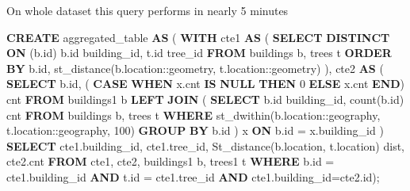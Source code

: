 \documentclass[11pt]{article}
\newenvironment{Shaded}{}{}
\newcommand{\KeywordTok}[1]{\textcolor[rgb]{0.00,0.44,0.13}{\textbf{{#1}}}}
\newcommand{\DecValTok}[1]{\textcolor[rgb]{0.25,0.63,0.44}{{#1}}}
\newcommand{\CharTok}[1]{\textcolor[rgb]{0.25,0.44,0.63}{{#1}}}
\newcommand{\FunctionTok}[1]{\textcolor[rgb]{0.02,0.16,0.49}{{#1}}}
\newcommand{\NormalTok}[1]{{#1}}
\begin{document}
On whole dataset this query performs in nearly 5 minutes

    \begin{Shaded}
\begin{Highlighting}[]
\KeywordTok{CREATE}\NormalTok{ aggregated_table }\KeywordTok{AS}\NormalTok{ ( }
\KeywordTok{WITH} 
\NormalTok{cte1 }\KeywordTok{AS} 
\NormalTok{        ( }
          \KeywordTok{SELECT} \KeywordTok{DISTINCT} \KeywordTok{ON}\NormalTok{ (b.id) b.id building_id, }
\NormalTok{          t.id tree_id }
          \KeywordTok{FROM}\NormalTok{ buildings b, }
\NormalTok{               trees     t }
          \KeywordTok{ORDER} \KeywordTok{BY}\NormalTok{ b.id, }
\NormalTok{                   st_distance(b.location:}\CharTok{:geometry}\NormalTok{, t.location:}\CharTok{:geometry}\NormalTok{) }
\NormalTok{        ), }
\NormalTok{cte2 }\KeywordTok{AS}
\NormalTok{        ( }
          \KeywordTok{SELECT}\NormalTok{ b.id, ( }
                    \KeywordTok{CASE} 
                      \KeywordTok{WHEN}\NormalTok{ x.cnt }\KeywordTok{IS} \KeywordTok{NULL} 
                      \KeywordTok{THEN} \DecValTok{0} 
                      \KeywordTok{ELSE}\NormalTok{ x.cnt }
                    \KeywordTok{END}\NormalTok{) cnt }
          \KeywordTok{FROM}\NormalTok{      buildings1 b }
          \KeywordTok{LEFT} \KeywordTok{JOIN} 
\NormalTok{                    ( }
                      \KeywordTok{SELECT}\NormalTok{   b.id building_id, }
                               \FunctionTok{count}\NormalTok{(b.id) cnt }
                      \KeywordTok{FROM}\NormalTok{  buildings b, }
\NormalTok{                            trees t }
                      \KeywordTok{WHERE}\NormalTok{ st_dwithin(b.location:}\CharTok{:geography}\NormalTok{, t.location:}\CharTok{:geography}\NormalTok{, }\DecValTok{100}\NormalTok{)}
                      \KeywordTok{GROUP} \KeywordTok{BY}\NormalTok{ b.id}
\NormalTok{                    ) x }
          \KeywordTok{ON}\NormalTok{ b.id = x.building_id }
\NormalTok{        )}
\KeywordTok{SELECT}\NormalTok{ cte1.building_id, }
\NormalTok{       cte1.tree_id, }
\NormalTok{       St_distance(b.location, t.location) dist, }
\NormalTok{       cte2.cnt }
\KeywordTok{FROM}\NormalTok{   cte1, }
\NormalTok{       cte2, }
\NormalTok{       buildings1 b, }
\NormalTok{       trees1 t }
\KeywordTok{WHERE}\NormalTok{  b.id = cte1.building_id }
\KeywordTok{AND}\NormalTok{    t.id = cte1.tree_id }
\KeywordTok{AND}\NormalTok{    cte1.building_id=cte2.id);}
\end{Highlighting}
\end{Shaded}
\end{document}
